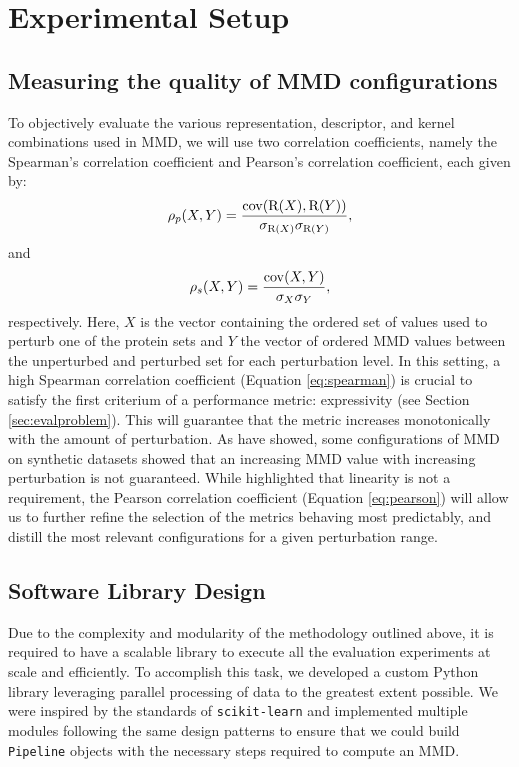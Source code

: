 \section{Experimental Setup}

\subsection{Measuring the quality of MMD configurations}

To objectively evaluate the various representation, descriptor, and kernel
combinations used in MMD, we will use two correlation coefficients, namely the
Spearman's correlation coefficient and Pearson's correlation coefficient, each
given by:
\begin{equation}
  \label{eq:spearman} \rho_p(X,Y) = {\mathrm{cov}(\mathrm{R}(X), \mathrm{R}(Y)) \over
\sigma_{\mathrm{R}(X)}\sigma_{\mathrm{R}(Y)}},
\end{equation} and
\begin{equation}
  \label{eq:pearson} \rho_s(X,Y) = {\mathrm{cov}(X, Y)\over \sigma_X\sigma_Y},
\end{equation}
respectively. Here, $X$ is the vector containing the ordered set of values used
to perturb one of the protein sets and $Y$ the vector of ordered MMD values
between the unperturbed and perturbed set for each perturbation level. In this
setting, a high Spearman correlation coefficient (Equation \ref{eq:spearman}) is
crucial to satisfy the first criterium of a performance metric: expressivity
(see Section \ref{sec:evalproblem}). This will guarantee that the metric
increases monotonically with the amount of perturbation. As
\cite{o2021evaluation} have showed, some configurations of MMD on synthetic
datasets showed that an increasing MMD value with increasing perturbation is not
guaranteed. While \cite{thompson2022evaluation} highlighted that linearity is
not a requirement, the Pearson correlation coefficient (Equation
\ref{eq:pearson}) will allow us to further refine the selection of the metrics
behaving most predictably, and distill the most relevant configurations for a
given perturbation range.

\subsection{Software Library Design}

Due to the complexity and modularity of the methodology outlined above, it is
required to have a scalable library to execute all the evaluation experiments at
scale and efficiently. To accomplish this task, we developed a custom Python
library leveraging parallel processing of data to the greatest extent possible.
We were inspired by the standards of \texttt{scikit-learn} and implemented
multiple modules following the same design patterns to ensure that we could
build \texttt{Pipeline} objects with the necessary steps required to compute an
MMD.

